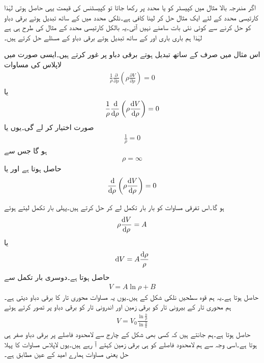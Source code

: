 اگر مندرجہ بالا مثال میں کپیسٹر کو  یا  محدد پر رکھا جاتا تو کپیسٹنس کی قیمت یہی حاصل ہوتی لہٰذا کارتیسی محدد کے لئے ایک مثال حل کر لینا کافی ہے۔نلکی محدد میں  کے ساتھ تبدیل ہوتے برقی دباو کو حل کرنے سے کوئی نئی بات سامنے نہیں آتی۔یہ بالکل کارتیسی محدد کے مثال کی طرح ہی ہے لہٰذا ہم باری باری  اور  کے ساتھ تبدیل ہوتے برقی دباو کے مسئلے حل کرتے ہیں۔


اس مثال میں صرف  کے ساتھ تبدیل ہوتے برقی دباو پر غور کرتے ہیں۔ایسی صورت میں لاپلاس کی مساوات
\begin{align*}
\frac{1}{\rho} \frac{\partial}{\partial \rho} \left(\rho \frac{\partial V}{\partial \rho} \right)=0
\end{align*}
یا
\begin{align}\label{مساوات_لاپلاس_ہم_محوری_لاپلاسی}
\frac{1}{\rho}\frac{\dif}{\dif \rho} \left(\rho \frac{\dif V}{\dif \rho} \right)=0
\end{align}
صورت اختیار کر لے گی۔یوں یا
\begin{align*}
\frac{1}{\rho}=0
\end{align*}
ہو گا جس سے
\begin{align}\label{مساوات_لاپلاس_ہم_محوری_لاپلاسی_پہلا-حل}
\rho=\infty
\end{align}
حاصل ہوتا ہے اور یا
\begin{align}\label{مساوات_لاپلاس_ہم_محوری_لاپلاسی_ب}
\frac{\dif}{\dif \rho} \left(\rho \frac{\dif V}{\dif \rho} \right)=0
\end{align}

ہو گا۔اس تفرقی مساوات کو بار بار تکمل لے کر حل کرتے ہیں۔پہلی بار تکمل لیتے ہوئے
\begin{align*}
\rho \frac{\dif V}{\dif \rho}=A
\end{align*}
یا
\begin{align*}
\dif V=A \frac{\dif \rho}{\rho}
\end{align*}
حاصل ہوتا ہے۔دوسری بار تکمل سے
\begin{align*}
V=A \ln \rho+B
\end{align*}
حاصل ہوتا ہے۔یہ ہم قوہ سطحیں نلکی شکل کے ہیں۔یوں یہ مساوات محوری تار کا برقی دباو دیتی ہے۔ہم محوری تار کے بیرونی تار  کو برقی زمین اور اندرونی تار  کو  برقی دباو پر تصور کرتے ہوئے
\begin{align}\label{مساوات_لاپلاس_ہم_محوری_لاپلاسی_ب_حل}
V=V_0 \frac{\ln \frac{b}{\rho} }{\ln \frac{b}{a} }
\end{align}
حاصل ہوتا ہے۔ہم جانتے ہیں کہ کسی بھی شکل کے چارج سے لامحدود فاصلے پر برقی دباو صفر ہی ہوتا ہے۔اسی وجہ سے ہم لامحدود فاصلے کو ہی برقی زمین کہتے آ رہے ہیں۔یوں لاپلاس مساوات کا پہلا حل یعنی مساوات  ہمارے امید کے عین مطابق ہے۔

